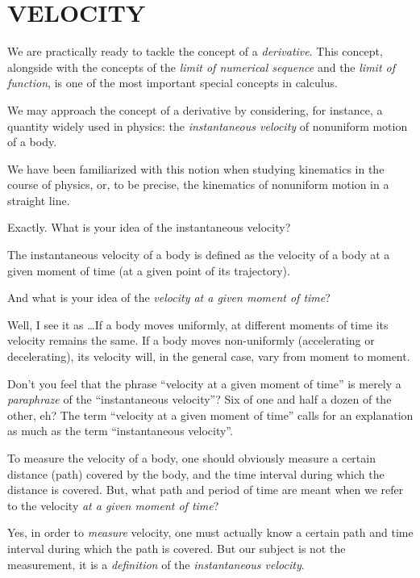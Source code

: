 

\chapter{VELOCITY}
\label{velocity}
{\parindent=0pt

\athr We are practically ready to tackle the concept of a \emph{derivative}. This concept, alongside with the concepts of the \emph{limit of numerical sequence} and the \emph{limit of function}, is one of the most important special concepts in calculus.

We may approach the concept of a derivative by considering, for instance, a quantity widely used in physics: the \emph{instantaneous velocity} of nonuniform motion of a body.

\rdr We have been familiarized with this notion when studying kinematics in the course of physics, or, to be precise, the kinematics of nonuniform motion in a straight line.

\athr Exactly. What is your idea of the instantaneous velocity?

\rdr The instantaneous velocity of a body is defined as the velocity of a body at a given moment of time (at a given point of its trajectory).

\athr And what is your idea of the \emph{velocity at a given moment of time}?

\rdr Well, I see it as \ldots If a body moves uniformly, at different moments of time its velocity remains the same. If a body moves non-uniformly (accelerating or decelerating), its velocity will, in the general case, vary from moment to moment.

\athr Don't you feel that the phrase ``velocity at a given moment of time'' is merely a \emph{paraphraze} of the ``instantaneous velocity''? Six of one and half a dozen of the other, eh? The term ``velocity at a given moment of time'' calls for an explanation as much as the term ``instantaneous
velocity''. 

To measure the velocity of a body, one should obviously
measure a certain distance (path) covered by the body, and the time interval during which the distance is covered. But, what path and period of time are meant when we refer to the velocity \emph{at a given moment of time}?

\rdr Yes, in order to \emph{measure} velocity, one must actually know a certain path and time interval during which the path is covered. But our subject is not the measurement, it is a \emph{definition} of the \emph{instantaneous velocity}.

}
